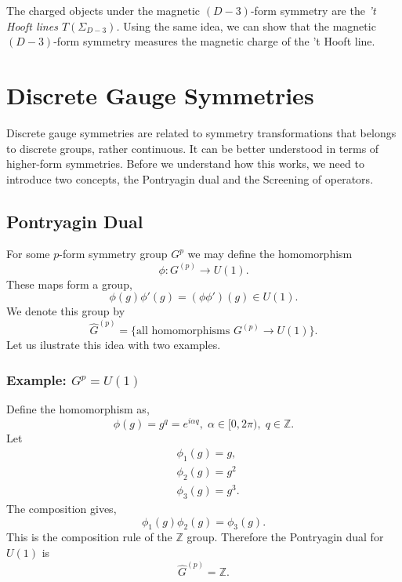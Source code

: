 \documentclass{article}
\begin{document}
The charged objects under the magnetic $(D-3)$-form symmetry are the \textit{'t Hooft lines $T(\Sigma_{D-3})$.} Using the same idea, we can show that the magnetic $(D-3)$-form symmetry measures the magnetic charge of the 't Hooft line. 
\section{Discrete Gauge Symmetries}
Discrete gauge symmetries are related to symmetry transformations that belongs to discrete groups, rather continuous. It can be better understood in terms of higher-form symmetries. Before we understand how this works, we need to introduce two concepts, the Pontryagin dual and the Screening of operators. 

\subsection{Pontryagin Dual}
For some $p$-form symmetry group $G^p$ we may define the homomorphism 
\begin{equation}
	\phi:G^{(p)}\to U(1). 
\end{equation}
These maps form a group, 
\begin{equation}
	\phi(g)\phi'(g)=(\phi\phi')(g)\in U(1).
\end{equation}
We denote this group by 
\begin{equation}
	\widehat{G}^{(p)}=\{\text{all homomorphisms }G^{(p)}\to U(1) \}.
\end{equation}
Let us ilustrate this idea with two examples. 
\subsubsection*{Example: $G^{p}=U(1)$}
Define the homomorphism as,
\begin{equation}
	\phi(g)=g^q=e^{i\alpha q},\; \alpha\in [0,2\pi),\;q\in\mathbb{Z}.
\end{equation}
Let 
\begin{align}
	&\phi_1(g)=g,\\
	&\phi_2(g)=g^2\\
	&\phi_3(g)=g^3.
\end{align}
The composition gives, 
\begin{equation}
	\phi_1(g)\phi_2(g)=\phi_3(g). 
\end{equation}
This is the composition rule of the $\mathbb{Z}$ group. Therefore the Pontryagin dual for $U(1)$ is 
\begin{equation}
	\widehat{G}^{(p)}=\mathbb{Z}.
\end{equation}
\end{document}
